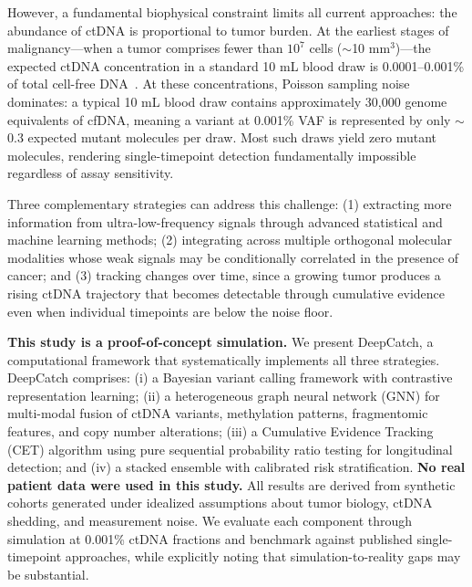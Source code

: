 \documentclass[10pt,a4paper]{article}
\begin{document}
However, a fundamental biophysical constraint limits all current approaches: the abundance of ctDNA is proportional to tumor burden. At the earliest stages of malignancy—when a tumor comprises fewer than $10^7$ cells ($\sim$10 mm$^3$)—the expected ctDNA concentration in a standard 10 mL blood draw is 0.0001--0.001\% of total cell-free DNA~\cite{avanzini2020mathematical}. At these concentrations, Poisson sampling noise dominates: a typical 10 mL blood draw contains approximately 30,000 genome equivalents of cfDNA, meaning a variant at 0.001\% VAF is represented by only $\sim$0.3 expected mutant molecules per draw. Most such draws yield zero mutant molecules, rendering single-timepoint detection fundamentally impossible regardless of assay sensitivity.

Three complementary strategies can address this challenge: (1) extracting more information from ultra-low-frequency signals through advanced statistical and machine learning methods; (2) integrating across multiple orthogonal molecular modalities whose weak signals may be conditionally correlated in the presence of cancer; and (3) tracking changes over time, since a growing tumor produces a rising ctDNA trajectory that becomes detectable through cumulative evidence even when individual timepoints are below the noise floor.

\textbf{This study is a proof-of-concept simulation.} We present DeepCatch, a computational framework that systematically implements all three strategies. DeepCatch comprises: (i) a Bayesian variant calling framework with contrastive representation learning; (ii) a heterogeneous graph neural network (GNN) for multi-modal fusion of ctDNA variants, methylation patterns, fragmentomic features, and copy number alterations; (iii) a Cumulative Evidence Tracking (CET) algorithm using pure sequential probability ratio testing for longitudinal detection; and (iv) a stacked ensemble with calibrated risk stratification. \textbf{No real patient data were used in this study.} All results are derived from synthetic cohorts generated under idealized assumptions about tumor biology, ctDNA shedding, and measurement noise. We evaluate each component through simulation at 0.001\% ctDNA fractions and benchmark against published single-timepoint approaches, while explicitly noting that simulation-to-reality gaps may be substantial.

\end{document}

